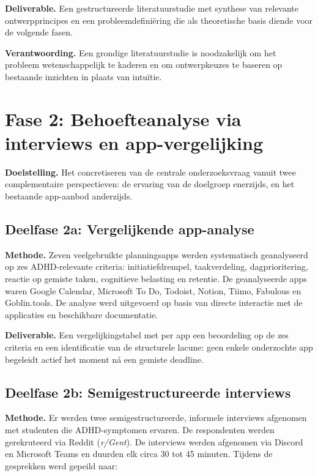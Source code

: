 \textbf{Deliverable.}
Een gestructureerde literatuurstudie met synthese van relevante ontwerpprincipes en
een probleemdefiniëring die als theoretische basis diende voor de volgende fasen.

\textbf{Verantwoording.}
Een grondige literatuurstudie is noodzakelijk om het probleem wetenschappelijk te
kaderen en om ontwerpkeuzes te baseren op bestaande inzichten in plaats van
intuïtie.

\section{Fase 2: Behoefteanalyse via interviews en app-vergelijking}

\textbf{Doelstelling.}
Het concretiseren van de centrale onderzoeksvraag vanuit twee complementaire
perspectieven: de ervaring van de doelgroep enerzijds, en het bestaande
app-aanbod anderzijds.

\subsection{Deelfase 2a: Vergelijkende app-analyse}

\textbf{Methode.}
Zeven veelgebruikte planningsapps werden systematisch geanalyseerd op zes
ADHD-relevante criteria: initiatiefdrempel, taakverdeling, dagprioritering, reactie
op gemiste taken, cognitieve belasting en retentie. De geanalyseerde apps waren
Google Calendar, Microsoft To Do, Todoist, Notion, Tiimo, Fabulous en
Goblin.tools. De analyse werd uitgevoerd op basis van directe interactie met de
applicaties en beschikbare documentatie.

\textbf{Deliverable.}
Een vergelijkingstabel met per app een beoordeling op de zes criteria en een
identificatie van de structurele lacune: geen enkele onderzochte app begeleidt
actief het moment ná een gemiste deadline.

\subsection{Deelfase 2b: Semigestructureerde interviews}

\textbf{Methode.}
Er werden twee semigestructureerde, informele interviews afgenomen met studenten
die ADHD-symptomen ervaren. De respondenten werden gerekruteerd via Reddit
(\textit{r/Gent}). De interviews werden afgenomen via Discord en Microsoft Teams
en duurden elk circa 30 tot 45 minuten. Tijdens de gesprekken werd gepeild naar:


